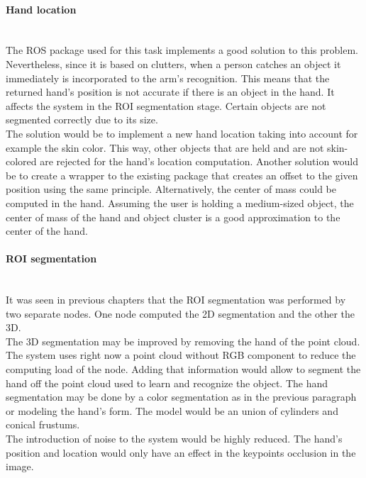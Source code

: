 	\paragraph{Hand location}\mbox{}\\

	The ROS package used for this task implements a good solution to this problem. 
	Nevertheless, since it is based on clutters, when a person catches an object it immediately is incorporated to the arm's recognition. 
	This means that the returned hand's position is not accurate if there is an object in the hand. 
	It affects the system in the ROI segmentation stage. 
	Certain objects are not segmented correctly due to its size.  
	\\

	The solution would be to implement a new hand location taking into account for example the skin color. 
	This way, other objects that are held and are not skin-colored are rejected for the hand's location computation. 
	Another solution would be to create a wrapper to the existing package that creates an offset to the given position using the same principle. 
	Alternatively, the center of mass could be computed in the hand. 
	Assuming the user is holding a medium-sized object, the center of mass of the hand and object cluster is a good approximation to the center of the hand. 
	\\
	
	\paragraph{ROI segmentation}\mbox{}\\

	It was seen in previous chapters that the ROI segmentation was performed by two separate nodes. 
	One node computed the 2D segmentation and the other the 3D. 
	\\

	The 3D segmentation may be improved by removing the hand of the point cloud. 
	The system uses right now a point cloud without RGB component to reduce the computing load of the node. 
	Adding that information would allow to segment the hand off the point cloud used to learn and recognize the object. 
	The hand segmentation may be done by a color segmentation as in the previous paragraph or modeling the hand's form. 
	The model would be an union of cylinders and conical frustums.
	\\

	The introduction of noise to the system would be highly reduced.
	The hand's position and location would only have an effect in the keypoints occlusion in the image. 
	\\

